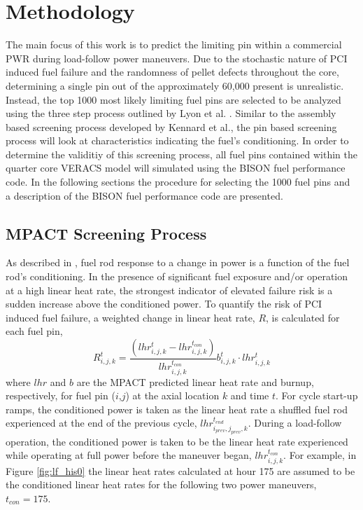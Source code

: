 \documentclass[edeposit,fullpage,11pt]{uiucthesis2009}
\begin{document}
\chapter{Methodology}
The main focus of this work is to predict the limiting pin within a commercial \gls{PWR} during load-follow power maneuvers.
Due to the stochastic nature of \gls{PCI} induced fuel failure and the randomness of pellet defects throughout the core, determining a single pin out of the approximately 60,000 present is unrealistic.
Instead, the top 1000 most likely limiting fuel pins are selected to be analyzed using the three step process outlined by Lyon et al. \cite{lyon_pci_2009}.
Similar to the assembly based screening process developed by Kennard et al., the pin based screening process will look at characteristics indicating the fuel's conditioning.
In order to determine the validitiy of this screening process, all fuel pins contained within the quarter core \gls{VERACS} model will simulated using the BISON fuel performance code.
In the following sections the procedure for selecting the 1000 fuel pins and a description of the BISON fuel performance code are presented.

\section{MPACT Screening Process}

As described in \cite{capps_evaluation_2016,kennard_pci_2016}, fuel rod response to a change in power is a function of the fuel rod's conditioning. 
In the presence of significant fuel exposure and/or operation at a high linear heat rate, the strongest indicator of elevated failure risk is a sudden increase above the conditioned power.
To quantify the risk of \gls{PCI} induced fuel failure, a weighted change in linear heat rate, $R$, is calculated for each fuel pin,
\begin{equation}
R_{i,j,k}^{t} = \frac{\left( lhr_{i,j,k}^t-lhr_{i,j,k}^{t_{con}}\right)}{lhr_{i,j,k}^{t_{con}}} b_{i,j,k}^t \cdot lhr_{i,j,k}^{t}
\end{equation}
where $lhr$ and $b$ are the MPACT predicted linear heat rate and burnup, respectively, for fuel pin ($i$,$j$) at the axial location $k$ and time $t$.
For cycle start-up ramps, the conditioned power is taken as the linear heat rate a shuffled fuel rod experienced at the end of the previous cycle, $lhr_{i_{prev},j_{prev},k}^{t_{end}}$.
During a load-follow operation, the conditioned power is taken to be the linear heat rate experienced while operating at full power before the maneuver began, $lhr_{i,j,k}^{t_{con}}$.
For example, in Figure \ref{fig:lf_his0} the linear heat rates calculated at hour 175 are assumed to be the conditioned linear heat rates for the following two power maneuvers, $t_{con}=175$. 
\end{document}
